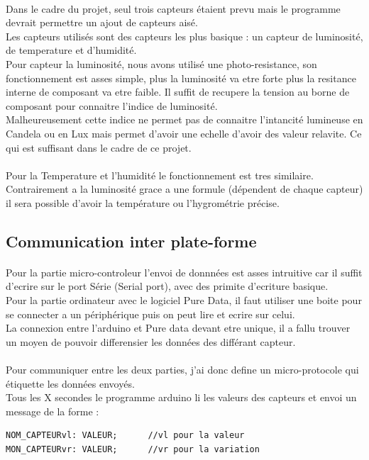 \documentclass[a4paper, titlepage, oneside, 12pt]{article}%
\begin{document}
\paragraph{}
Dans le cadre du projet, seul trois capteurs étaient prevu mais le programme devrait permettre un ajout de capteurs  aisé.\\
Les capteurs utilisés sont des capteurs les plus basique : un capteur de luminosité, de temperature et d'humidité.\\
Pour capteur la luminosité, nous avons utilisé une photo-resistance, son fonctionnement est asses simple, plus la luminosité va etre forte plus la resitance interne de composant va etre faible. Il suffit de recupere la tension au borne de composant pour connaitre l'indice de luminosité.\\ 
Malheureusement cette indice ne permet pas de connaitre l'intancité lumineuse en Candela ou en Lux mais permet d'avoir une echelle d'avoir des valeur relavite. Ce qui est suffisant dans le cadre de ce projet.
\paragraph{}
Pour la Temperature et l'humidité le fonctionnement est tres similaire. Contrairement a la luminosité grace a une formule (dépendent de chaque capteur) il sera possible d'avoir la température ou l'hygrométrie précise. 

\subsection{Communication inter plate-forme}
\paragraph{}
Pour la partie micro-controleur l'envoi de donnnées est asses intruitive car il suffit d'ecrire sur le port Série (Serial port), avec des primite d'ecriture basique.\\
Pour la partie ordinateur avec le logiciel Pure Data, il faut utiliser une boite pour se connecter a un périphérique puis on peut lire et ecrire sur celui.\\
La connexion entre l'arduino et Pure data devant etre unique, il a fallu trouver un moyen de pouvoir differensier les données des différant capteur. 

\paragraph{}
Pour communiquer entre les deux parties, j'ai donc define un micro-protocole qui étiquette les données envoyés.\\
Tous les X secondes le programme arduino li les valeurs des capteurs et envoi un message de la forme :
\begin{lstlisting}
NOM_CAPTEURvl: VALEUR;		//vl pour la valeur
MON_CAPTEURvr: VALEUR;		//vr pour la variation
\end{lstlisting}
\end{document}
